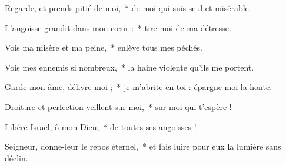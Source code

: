 \item Regarde, et prends pitié de moi,~* de moi qui suis seul et misérable.

\item L'angoisse grandit dans mon cœur :~* tire-moi de ma détresse.

\item Vois ma misère et ma peine,~* enlève tous mes péchés.

\item Vois mes ennemis si nombreux,~* la haine violente qu'ils me portent.

\item Garde mon âme, délivre-moi ;~* je m'abrite en toi : épargne-moi la honte.

\item Droiture et perfection veillent sur moi,~* sur moi qui t'espère !

\item Libère Israël, ô mon Dieu,~* de toutes ses angoisses !

\item Seigneur, donne-leur le repos éternel,~* et fais luire pour eux la lumière sans déclin.